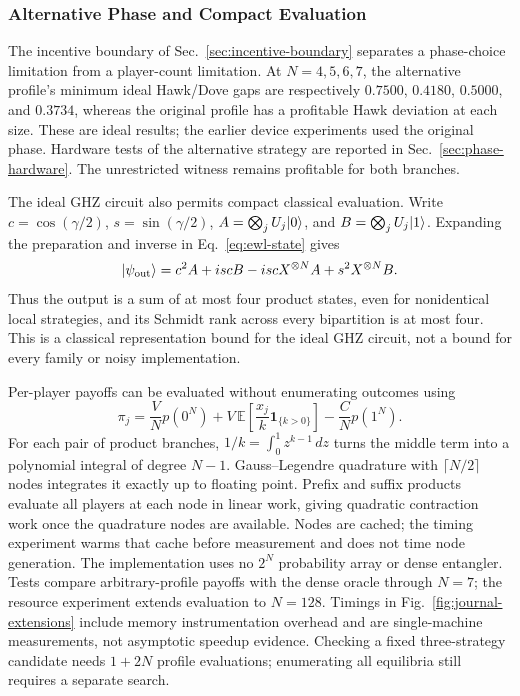 \subsubsection{Alternative Phase and Compact Evaluation}\label{sec:phase-results}
The incentive boundary of Sec.~\ref{sec:incentive-boundary} separates a
phase-choice limitation from a player-count limitation. At $N=4,5,6,7$,
the alternative profile's minimum ideal Hawk/Dove gaps are respectively
$0.7500$, $0.4180$, $0.5000$, and $0.3734$, whereas the original profile
has a profitable Hawk deviation at each size. These are ideal results;
the earlier device experiments used the original phase. Hardware tests of
the alternative strategy are reported in Sec.~\ref{sec:phase-hardware}.
The unrestricted witness remains
profitable for both branches.

The ideal GHZ circuit also permits compact classical evaluation. Write
$c=\cos(\gamma/2)$, $s=\sin(\gamma/2)$,
$A=\bigotimes_j U_j|0\rangle$, and $B=\bigotimes_j U_j|1\rangle$.
Expanding the preparation and inverse in Eq.~\eqref{eq:ewl-state} gives
\begin{equation}
|\psi_{\mathrm{out}}\rangle
=c^2 A+isc B-isc X^{\otimes N}A+s^2 X^{\otimes N}B.
\label{eq:four-branches}
\end{equation}
Thus the output is a sum of at most four product states, even for
nonidentical local strategies, and its Schmidt rank across every
bipartition is at most four. This is a classical representation bound
for the ideal GHZ circuit, not a bound for every family or noisy implementation.

Per-player payoffs can be evaluated without enumerating outcomes using
\begin{equation}
\pi_j=\frac VN p(0^N)
+V\,\mathbb E\!\left[\frac{x_j}{k}\mathbf1_{\{k>0\}}\right]
-\frac CN p(1^N).
\label{eq:compact-payoff}
\end{equation}
For each pair of product branches, $1/k=\int_0^1z^{k-1}\,dz$ turns
the middle term into a polynomial integral of degree $N-1$.
Gauss--Legendre quadrature with $\lceil N/2\rceil$ nodes integrates it
exactly up to floating point. Prefix and suffix products evaluate all
players at each node in linear work, giving quadratic contraction work once
the quadrature nodes are available. Nodes are cached; the timing experiment
warms that cache before measurement and does not time node generation.
The implementation uses no $2^N$ probability array or dense entangler.
Tests compare arbitrary-profile payoffs with the dense oracle through
$N=7$; the resource experiment extends evaluation to $N=128$.
Timings in Fig.~\ref{fig:journal-extensions} include memory instrumentation
overhead and are single-machine measurements, not asymptotic speedup evidence.
Checking a fixed three-strategy candidate needs $1+2N$ profile evaluations;
enumerating all equilibria still requires a separate search.

